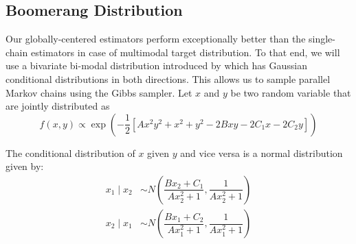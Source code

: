 \documentclass[11pt]{article}
\theoremstyle{remark}
\begin{document}
\subsection{Boomerang Distribution} \label{ex:boomerang}


Our globally-centered estimators perform exceptionally better than the single-chain estimators in case of multimodal target distribution. To that end, we will use a bivariate bi-modal distribution introduced by \cite{gelman1991note} which has Gaussian conditional distributions in both directions. This allows us to sample parallel Markov chains using the Gibbs sampler. Let $x$ and $y$ be two random variable that are jointly distributed as 
%
\[
f(x, y) \propto \exp\left(-\dfrac{1}{2} \left[Ax^2y^2 + x^2 + y^2 -2Bxy  -2C_1x - 2C_2y  \right]\right)
\]

The conditional distribution of $x$ given $y$ and vice versa is a normal distribution given by:
%
\begin{align*}
    x_1 \mid x_2 &\sim N\left(\dfrac{Bx_2 + C_1}{Ax_2^2 + 1}, \dfrac{1}{Ax_2^2 + 1}\right)\\
    x_2 \mid x_1 &\sim N\left(\dfrac{Bx_1 + C_2}{Ax_1^2 + 1}, \dfrac{1}{Ax_1^2 + 1}\right)
\end{align*}
\end{document}
